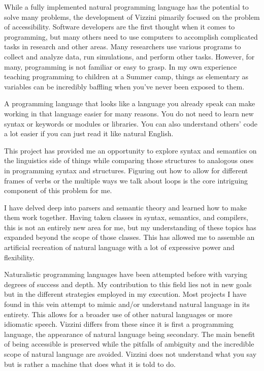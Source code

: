 \documentclass[titlepage]{article}
\newcommand{\langName}{Vizzini}
\begin{document}
While a fully implemented natural programming language has the potential to solve many problems, the development of \langName{} pimarily focused on the problem of accessibility. Software developers are the first thought when it comes to programming, but many others need to use computers to accomplish complicated tasks in research and other areas. Many researchers use various programs to collect and analyze data, run simulations, and perform other tasks. However, for many, programming is not familiar or easy to grasp. In my own experience teaching programming to children at a Summer camp, things as elementary as variables can be incredibly baffling when you've never been exposed to them.

A programming language that looks like a language you already speak can make working in that language easier for many reasons. You do not need to learn new syntax or keywords or modules or libraries. You can also understand others' code a lot easier if you can just read it like natural English.

This project has provided me an opportunity to explore syntax and semantics on the linguistics side of things while comparing those structures to analogous ones in programming syntax and structures. Figuring out how to allow for different frames of verbs or the multiple ways we talk about loops is the core intriguing component of this problem for me.

I have delved deep into parsers and semantic theory and learned how to make them work together. Having taken classes in syntax, semantics, and compilers, this is not an entirely new area for me, but my understanding of these topics has expanded beyond the scope of those classes. This has allowed me to assemble an artificial recreation of natural language with a lot of expressive power and flexibility.

Naturalistic programming languages have been attempted before with varying degrees of success and depth. My contribution to this field lies not in new goals but in the different strategies employed in my execution. Most projects I have found in this vein attempt to mimic and/or understand natural language in its entirety. This allows for a broader use of other natural languages or more idiomatic speech. \langName{} differs from these since it is first a programming language, the appearance of natural language being secondary. The main benefit of being accessible is preserved while the pitfalls of ambiguity and the incredible scope of natural language are avoided. \langName{} does not understand what you say but is rather a machine that does what it is told to do.
\end{document}
